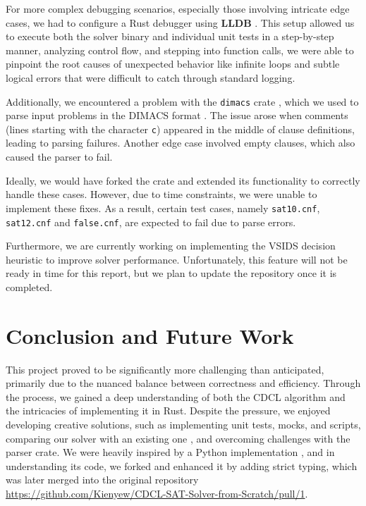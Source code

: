 \documentclass[a4paper,12pt]{article}
\begin{document}
For more complex debugging scenarios, especially those involving intricate edge cases, we had
to configure a Rust debugger using \textbf{LLDB} \cite{LLDB}. This setup allowed us to execute
both the solver binary and individual unit tests in a step-by-step manner, analyzing control flow,
and stepping into function calls, we were able to pinpoint the root causes of unexpected behavior
like infinite loops and subtle logical errors that were difficult to catch through standard logging.

Additionally, we encountered a problem with the \texttt{dimacs} crate \cite{DimacsCrate}, which
we used to parse input problems in the DIMACS format \cite{DimacsFormat}. The issue arose when
comments (lines starting with the character \texttt{c}) appeared in the middle of clause definitions,
leading to parsing failures. Another edge case involved empty clauses, which also caused the parser to fail.

Ideally, we would have forked the crate and extended its functionality to correctly handle these cases.
However, due to time constraints, we were unable to implement these fixes. As a result, certain test cases,
namely \texttt{sat10.cnf}, \texttt{sat12.cnf} and \texttt{false.cnf}, are expected to fail due to parse errors.

Furthermore, we are currently working on implementing the VSIDS decision heuristic to improve solver performance.
Unfortunately, this feature will not be ready in time for this report, but we plan to update the
repository once it is completed.

\section{Conclusion and Future Work}
\label{sec:conclusion}
This project proved to be significantly more challenging than anticipated, primarily due to the nuanced
balance between correctness and efficiency. Through the process, we gained a deep understanding of both
the CDCL algorithm and the intricacies of implementing it in Rust. Despite the pressure, we enjoyed developing
creative solutions, such as implementing unit tests, mocks, and scripts, comparing our solver with an
existing one \cite{Minisat}, and overcoming challenges with the parser crate. We were heavily inspired
by a Python implementation \cite{PythonCDCL}, and in understanding its code, we forked and enhanced it
by adding strict typing, which was later merged into the original repository \url{https://github.com/Kienyew/CDCL-SAT-Solver-from-Scratch/pull/1}.
\end{document}
